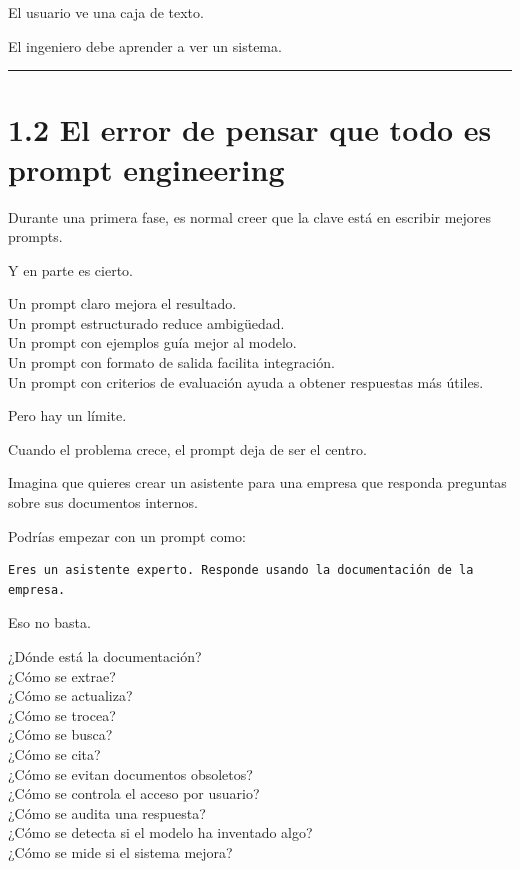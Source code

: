 El usuario ve una caja de texto.

El ingeniero debe aprender a ver un sistema.

\begin{center}\rule{0.5\linewidth}{0.5pt}\end{center}

\section{1.2 El error de pensar que todo es prompt
engineering}\label{el-error-de-pensar-que-todo-es-prompt-engineering}

Durante una primera fase, es normal creer que la clave está en escribir
mejores prompts.

Y en parte es cierto.

Un prompt claro mejora el resultado.\\
Un prompt estructurado reduce ambigüedad.\\
Un prompt con ejemplos guía mejor al modelo.\\
Un prompt con formato de salida facilita integración.\\
Un prompt con criterios de evaluación ayuda a obtener respuestas más
útiles.

Pero hay un límite.

Cuando el problema crece, el prompt deja de ser el centro.

Imagina que quieres crear un asistente para una empresa que responda
preguntas sobre sus documentos internos.

Podrías empezar con un prompt como:

\begin{lstlisting}
Eres un asistente experto. Responde usando la documentación de la empresa.
\end{lstlisting}

Eso no basta.

¿Dónde está la documentación?\\
¿Cómo se extrae?\\
¿Cómo se actualiza?\\
¿Cómo se trocea?\\
¿Cómo se busca?\\
¿Cómo se cita?\\
¿Cómo se evitan documentos obsoletos?\\
¿Cómo se controla el acceso por usuario?\\
¿Cómo se audita una respuesta?\\
¿Cómo se detecta si el modelo ha inventado algo?\\
¿Cómo se mide si el sistema mejora?

